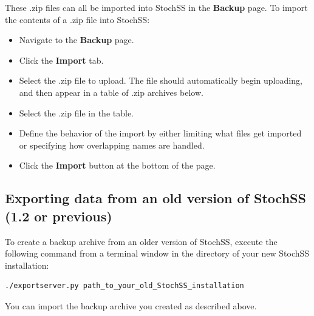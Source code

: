 These .zip files can all be imported into StochSS in the \textbf{Backup} page. To import the contents of a .zip file into StochSS:

\begin{itemize}
\item Navigate to the \textbf{Backup} page.
\item Click the \textbf{Import} tab.
\item Select the .zip file to upload. The file should automatically begin uploading, and then appear in a table of .zip archives below.
\item Select the .zip file in the table.
\item Define the behavior of the import by either limiting what files get imported or specifying how overlapping names are handled.
\item Click the \textbf{Import} button at the bottom of the page.
\end{itemize}

\subsection{Exporting data from an old version of StochSS (1.2 or previous)}
To create a backup archive from an older version of StochSS, execute the following command from a terminal window in the directory of your new StochSS installation:
\begin{verbatim}
./exportserver.py path_to_your_old_StochSS_installation
\end{verbatim}
You can import the backup archive you created as described above.

